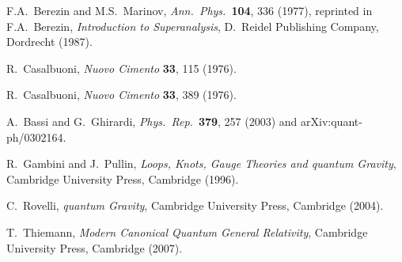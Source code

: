 \documentclass[12pt]{article}
\begin{document}
\begin{thebibliography}{100}
{F.A.\ Berezin and M.S.\ Marinov, {\em Ann.\ Phys.}\ {\bf 104}, 336 (1977),
  reprinted in F.A.\ Berezin, {\em Introduction to Superanalysis}, D.\ Reidel
  Publishing Company, Dordrecht (1987).}

{R.\ Casalbuoni, {\em Nuovo Cimento} {\bf 33}, 115 (1976).}

{R.\ Casalbuoni, {\em Nuovo Cimento} {\bf 33}, 389 (1976).}

{A.\ Bassi and G.\ Ghirardi, {\em Phys.\ Rep.}\ {\bf 379}, 257 (2003) and
  arXiv:quant-ph/0302164.}

{R.\ Gambini and J.\ Pullin, {\em Loops, Knots, Gauge Theories and quantum
  Gravity}, Cambridge University Press, Cambridge (1996).}

{C.\ Rovelli, {\em quantum Gravity}, Cambridge University Press, Cambridge
  (2004).}

{T.\ Thiemann, {\em Modern Canonical Quantum General Relativity}, Cambridge
  University Press, Cambridge (2007).}

\end{thebibliography}
\end{document}

